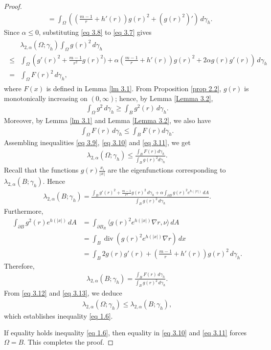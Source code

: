 \documentclass[11pt,leqno]{amsart}
\def\a{\alpha}
\def\l{\lambda}
\def\p{\partial}
\def \p {\partial}
\numberwithin{equation}{section}
\begin{document}
\begin{proof}
\begin{align}
    &=\int_{\Omega}\left((\frac{m-1}{r}+h'(r))g(r)^{2}+(g(r)^{2})'\right)\, d\gamma_h.
\end{align}    
Since $\a\le 0$, substituting  \eqref{eq 3.8} to \eqref{eq 3.7} gives
\begin{align}\label{eq 3.9}
\begin{split}
  &\l_{2, \a}(\Omega; \gamma_h)\int_{\Omega} g(r)^2\, d\gamma_h\\
  \le& \int_{\Omega} \left(g'(r)^2+\frac{m-1}{r^2} g(r)^2)+\a (\frac {m-1} r+h'(r))g(r)^2+2\a g(r)g'(r)\right) \, d\gamma_h\\
  =&\int_{\Omega} F(r)^2 \, d\gamma_h,
  \end{split}
\end{align}
where $F(x)$ is defined in Lemma \ref{lm 3.1}.
From Proposition \ref{prop 2.2}, $g(r)$ is monotonically increasing on $(0, \infty)$; hence, by Lemma \ref{Lemma 3.2}, 
\begin{align}\label{eq 3.10}
    \int_{\Omega}g^{2}\, d\gamma_h \geq \int_{B}g^{2}(r)\, d\gamma_h.
\end{align}
Moreover, by Lemma \ref{lm 3.1} and Lemma \ref{Lemma 3.2}, we also have  
\begin{align}\label{eq 3.11}
\int_{\Omega}F(r) \, d\gamma_h\leq \int_{B}F(r)d\gamma_h.
\end{align}
Assembling inequalities \eqref{eq 3.9}, \eqref{eq 3.10} and \eqref{eq 3.11}, we get
\begin{align}\label{eq 3.12}
      \l_{2, \a}(\Omega; \gamma_h)\le \frac{\int_{B}F(r)d\gamma_h}{\int_{B}g(r)^{2}d\gamma_h}.
\end{align}
Recall that the functions $g(r)\frac {x_i}{|x|}$ are the eigenfunctions corresponding to $\l_{2,\a}(B;\gamma_h)$. Hence
\begin{align*}
\l_{2,\a}(B;\gamma_h)=\frac{\int_{B} g'(r)^2+\frac{m-1}{r^2}g(r)^2\, d\gamma_h + \a\int_{\p B} g(r)^2 e^{h(|x|)}\, dA}{\int_{ B} g(r)^2\, d\gamma_h}.
\end{align*}
Furthermore,
\begin{align*}
\int_{\partial B} g^2(r)e^{h(|x|)}\, dA&=\int_{\partial B_R} \langle g(r)^2e^{h(|x|)}\nabla r, \nu\rangle\, dA\\
&=\int_{B} \operatorname{div}\left( g(r)^2 e^{h(|x|)} \nabla r\right)\, dx\\
&=\int_{B}2g(r)g'(r)+(\frac {m-1}{r}+h'(r))g(r)^2  \, d\gamma_h.
\end{align*}
Therefore,
\begin{align}\label{eq 3.13}
\l_{2,\a}(B;\gamma_h) =\frac{\int_{B} F(r)\, d\gamma_h}{\int_{B} g(r)^2\, d\gamma_h} .
\end{align}
From \eqref{eq 3.12} and \eqref{eq 3.13}, we deduce
\begin{align*}
       \l_{2, \a}(\Omega; \gamma_h)\le      \l_{2, \a}(B; \gamma_h),
\end{align*}
which establishes inequality \eqref{eq 1.6}.

If equality holds inequality \eqref{eq 1.6},
    then equality in  \eqref{eq 3.10} and \eqref{eq 3.11} forces $\Omega=B$.
     This completes the proof.
\end{proof}
\end{document}
